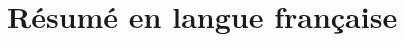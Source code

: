 \documentclass[anglais]{thesis-ubl}
\begin{document}

\appendix
\chapter{Résumé en langue française}\label{chap:resume_fr}



\cleartorecto
\listoffigures

\cleartorecto
\listofalgorithms

\cleartorecto
\listoftables

\printbibliography


\backmatter
\end{document}
